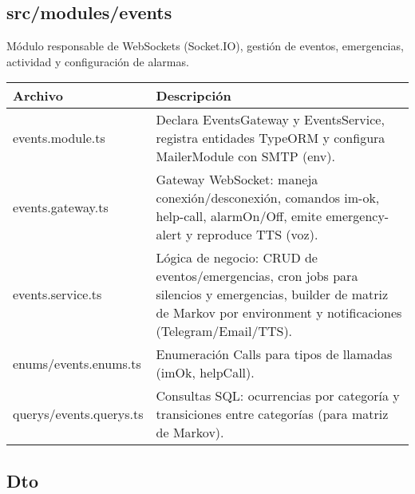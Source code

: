 \subsection*{src/modules/events}

Módulo responsable de WebSockets (Socket.IO), gestión de eventos, emergencias, actividad y configuración de alarmas.

\begin{table}[H]
  \doublespacing
  \begin{tabularx}{\textwidth}{l X}
    \hline
    \textbf{Archivo}        & \textbf{Descripción}                                                                                                                                                       \\
    \hline
    events.module.ts        & Declara EventsGateway y EventsService, registra entidades TypeORM y configura MailerModule con SMTP (env).                                                                 \\
    events.gateway.ts       & Gateway WebSocket: maneja conexión/desconexión, comandos im-ok, help-call, alarmOn/Off, emite emergency-alert y reproduce TTS (voz).                                       \\
    events.service.ts       & Lógica de negocio: CRUD de eventos/emergencias, cron jobs para silencios y emergencias, builder de matriz de Markov por environment y notificaciones (Telegram/Email/TTS). \\
    enums/events.enums.ts   & Enumeración Calls para tipos de llamadas (imOk, helpCall).                                                                                                                 \\
    querys/events.querys.ts & Consultas SQL: ocurrencias por categoría y transiciones entre categorías (para matriz de Markov).                                                                          \\
    \hline
  \end{tabularx}
\end{table}

\subsection*{Dto}

